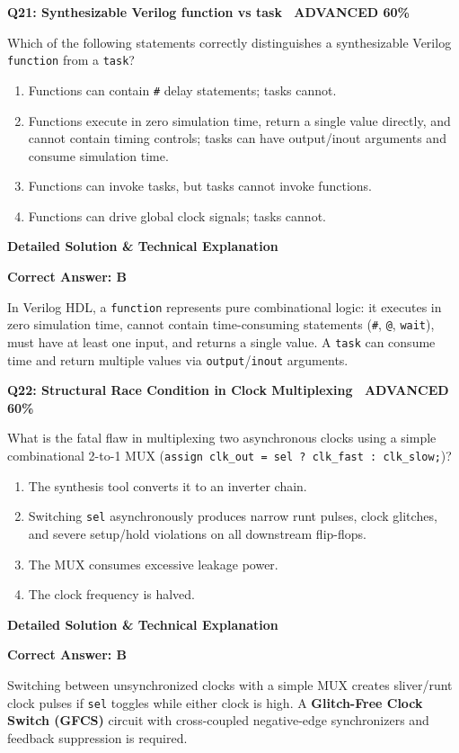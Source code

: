 \documentclass[11pt,a4paper]{article}
\newcommand{\badgeadv}{{\color{white}\colorbox{advred}{\bfseries\sffamily\tiny\ ADVANCED 60\%\ }}}
\newenvironment{qbox}[2]{%
  \begin{mdframed}[style=qstyle]%
  {\bfseries\sffamily\color{primaryblue}#1 \hfill #2}\par\vspace{2pt}%
}{%
  \end{mdframed}%
}
\newenvironment{ansbox}{%
  \begin{mdframed}[style=ansstyle]%
  {\bfseries\sffamily\color{ansgreen}\small Detailed Solution \& Technical Explanation}\par\vspace{2pt}\small%
}{%
  \end{mdframed}%
}
\begin{document}
\begin{qbox}{Q21: Synthesizable Verilog function vs task}{\badgeadv}
Which of the following statements correctly distinguishes a synthesizable Verilog \texttt{function} from a \texttt{task}?
\begin{enumerate}[label=\textbf{\Alph*.}]
  \item Functions can contain \texttt{\#} delay statements; tasks cannot.
  \item Functions execute in zero simulation time, return a single value directly, and cannot contain timing controls; tasks can have output/inout arguments and consume simulation time.
  \item Functions can invoke tasks, but tasks cannot invoke functions.
  \item Functions can drive global clock signals; tasks cannot.
\end{enumerate}
\end{qbox}
\begin{ansbox}
\textbf{Correct Answer: B}

In Verilog HDL, a \texttt{function} represents pure combinational logic: it executes in zero simulation time, cannot contain time-consuming statements (\texttt{\#}, \texttt{@}, \texttt{wait}), must have at least one input, and returns a single value. A \texttt{task} can consume time and return multiple values via \texttt{output}/\texttt{inout} arguments.
\end{ansbox}

\begin{qbox}{Q22: Structural Race Condition in Clock Multiplexing}{\badgeadv}
What is the fatal flaw in multiplexing two asynchronous clocks using a simple combinational 2-to-1 MUX (\texttt{assign clk\_out = sel ? clk\_fast : clk\_slow;})?
\begin{enumerate}[label=\textbf{\Alph*.}]
  \item The synthesis tool converts it to an inverter chain.
  \item Switching \texttt{sel} asynchronously produces narrow runt pulses, clock glitches, and severe setup/hold violations on all downstream flip-flops.
  \item The MUX consumes excessive leakage power.
  \item The clock frequency is halved.
\end{enumerate}
\end{qbox}
\begin{ansbox}
\textbf{Correct Answer: B}

Switching between unsynchronized clocks with a simple MUX creates sliver/runt clock pulses if \texttt{sel} toggles while either clock is high. A \textbf{Glitch-Free Clock Switch (GFCS)} circuit with cross-coupled negative-edge synchronizers and feedback suppression is required.
\end{ansbox}
\end{document}
